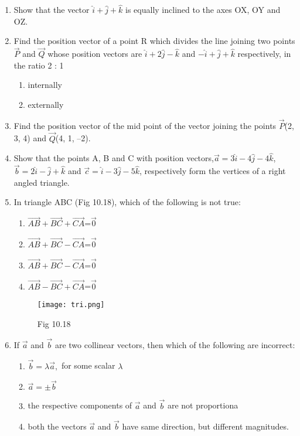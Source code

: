 \documentclass[12pt]{article}
\begin{document}
\begin{enumerate}
\item Show that the vector $\hat{i}+\hat{j}+\hat{k}$ is equally inclined to the axes OX, OY and OZ.
\item Find the position vector of a point R which divides the line joining two points $\Vec{P}$
and $\Vec{Q}$ whose position vectors are $\hat{i}+2\hat{j}-\hat{k}$ and $-\hat{i}+\hat{j}+\hat{k}$ respectively, in the
ratio 2 : 1
\begin{enumerate}[label=(\roman*)]
    \item  internally
    \item  externally
\end{enumerate}
\item Find the position vector of the mid point of the vector joining the points $\vec{P}$(2, 3, 4)
and $\vec{Q}$(4, 1, –2).
\item Show that the points A, B and C with position vectors,$\vec{a}=3\hat{i}-4\hat{j}-4\hat{k}$,$\vec{b}=2\hat{i}-\hat{j}+\hat{k}$ and $\vec{c}=\hat{i}-3\hat{j}-5\hat{k}$, respectively form the vertices of a right angled
triangle.
\item In triangle ABC (Fig 10.18), which of the following is not true:
 \begin{enumerate}
         \item $\overrightarrow{AB}+\overrightarrow{BC}+\overrightarrow{CA}$=$\vec{0}$
         \item $\overrightarrow{AB}+\overrightarrow{BC}-\overrightarrow{CA}$=$\vec{0}$
         \item $\overrightarrow{AB}+\overrightarrow{BC}-\overrightarrow{CA}$=$\vec{0}$
         \item $\overrightarrow{AB}-\overrightarrow{BC}+\overrightarrow{CA}$=$\vec{0}$
\end{enumerate}
\begin{figure}[!h]
\centering
  \texttt{[image: tri.png]}
\captionsetup{labelformat=empty}
\caption{Fig 10.18}
\label{(Fig 10.18)}
\end{figure}

\item If $\vec{a}$ and $\vec{b}$ are two collinear vectors, then which of the following are incorrect:
\begin{enumerate}
    \item $\vec{b}=\lambda\vec{a},$
 for some scalar $\lambda$
    \item $\vec{a}=\pm\vec{b}$
    \item the respective components of $\vec{a}$ and $\vec{b}$ are not proportiona
    \item both the vectors $\vec{a}$ and $\vec{b}$ have same direction, but different magnitudes.
\end{enumerate}
\end{enumerate}
\end{document}

